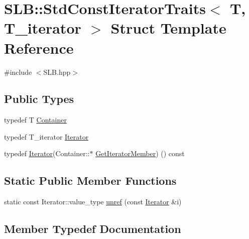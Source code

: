 \hypertarget{structSLB_1_1StdConstIteratorTraits}{}\section{S\+LB\+:\+:Std\+Const\+Iterator\+Traits$<$ T, T\+\_\+iterator $>$ Struct Template Reference}
\label{structSLB_1_1StdConstIteratorTraits}


{\ttfamily \#include $<$S\+L\+B.\+hpp$>$}

\subsection*{Public Types}
\begin{DoxyCompactItemize}
\item 
typedef T \hyperlink{structSLB_1_1StdConstIteratorTraits_afb27a41e2ace9890da5c0f804ada7824}{Container}
\item 
typedef T\+\_\+iterator \hyperlink{structSLB_1_1StdConstIteratorTraits_a4ebb83cafbab2244e8eb2b2a8ceb40ac}{Iterator}
\item 
typedef \hyperlink{structSLB_1_1StdConstIteratorTraits_a4ebb83cafbab2244e8eb2b2a8ceb40ac}{Iterator}(Container\+::$\ast$ \hyperlink{structSLB_1_1StdConstIteratorTraits_a35b71b2ca51d0a5369ad73453ad47a2d}{Get\+Iterator\+Member}) () const 
\end{DoxyCompactItemize}
\subsection*{Static Public Member Functions}
\begin{DoxyCompactItemize}
\item 
static const Iterator\+::value\+\_\+type \hyperlink{structSLB_1_1StdConstIteratorTraits_a3e6538a2e05f2e3520e690c6c511daed}{unref} (const \hyperlink{structSLB_1_1StdConstIteratorTraits_a4ebb83cafbab2244e8eb2b2a8ceb40ac}{Iterator} \&i)
\end{DoxyCompactItemize}


\subsection{Member Typedef Documentation}
